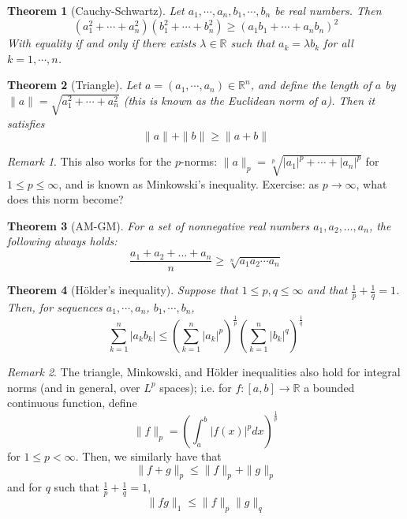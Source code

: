 \documentclass{article}
\newtheorem{theorem}{Theorem}[section]
\theoremstyle{definition}
\theoremstyle{remark}
\newtheorem*{remark}{Remark}
\begin{document}
\begin{theorem}[Cauchy-Schwartz]
Let $a_1,\cdots,a_n,b_1,\cdots, b_n$ be real numbers. Then
\begin{equation}
    (a_1^2 + \cdots + a_n^2)(b_1^2 + \cdots + b_n^2) \ge (a_1 b_1 + \cdots + a_nb_n)^2
\end{equation}
With equality if and only if there exists $\lambda \in \mathbb{R}$ such that $a_k = \lambda b_k$ for all $k = 1,\cdots, n$. 
\end{theorem}

\begin{theorem}[Triangle]
Let $a = (a_1,\cdots,a_n) \in \mathbb{R}^n$, and define the length of $a$ by $\|a\| = \sqrt{a_1^2 + \cdots + a_n^2}$ (this is known as the Euclidean norm of $a$). Then it satisfies 
\begin{equation}
    \|a \| + \|b\| \ge \|a + b\|
\end{equation}
\end{theorem}

\begin{remark}
This also works for the $p$-norms: $\|a\|_p = \sqrt[p]{|a_1|^p + \cdots + |a_n|^p}$ for $1 \le p \le \infty$, and is known as Minkowski's inequality. Exercise: as $p\to\infty$, what does this norm become?
\end{remark}

\begin{theorem}[AM-GM]
For a set of nonnegative real numbers $a_1, a_{2}, \ldots, a_n$, the following always holds: 
\begin{equation}
    \frac{a_1 + a_2 + \ldots + a_n}{n} \geq \sqrt[n]{a_{1}a_{2}\cdots a_{n}}
\end{equation}
\end{theorem}

\begin{theorem}[H\"older's inequality]
Suppose that $1 \le p,q \le \infty$ and that $\frac{1}{p} + \frac{1}{q} = 1$. Then, for sequences $a_1,\cdots,a_n$, $b_1,\cdots,b_n$,
\begin{equation}
    \sum_{k=1}^n \lvert a_k b_k \rvert \le \left(\sum_{k=1}^n \lvert a_k \rvert^p \right)^\frac{1}{p}  \left(\sum_{k=1}^n \lvert b_k \rvert^q \right)^\frac{1}{q} 
\end{equation}
\end{theorem}

\begin{remark}
The triangle, Minkowski, and H\"older inequalities also hold for integral norms (and in general, over $L^p$ spaces); i.e. for $f: [a,b] \rightarrow \mathbb{R}$ a bounded continuous function, define
\begin{equation*}
    \|f\|_p = \left(\int_a^b \lvert f(x) \rvert^p dx\right)^\frac{1}{p}
\end{equation*}
for $1 \le p < \infty$. Then, we similarly have that 
\begin{equation*}
    \| f + g\|_p \le \|f\|_p + \|g\|_p
\end{equation*}
and for $q$ such that $\frac{1}{p} + \frac{1}{q} = 1$,
\begin{equation*}
    \|fg\|_1 \le \|f\|_p\|g\|_q
\end{equation*}
\end{remark}
\end{document}
